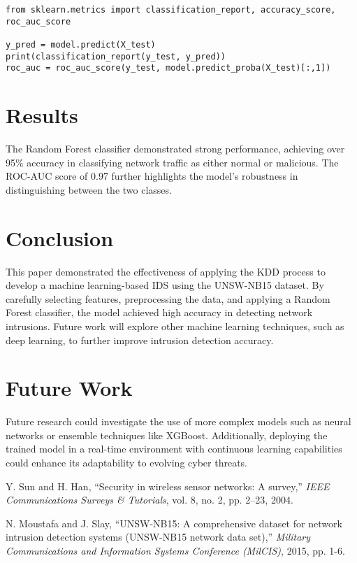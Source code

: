 \documentclass[12pt]{article}
\begin{document}
\begin{verbatim}
from sklearn.metrics import classification_report, accuracy_score, roc_auc_score

y_pred = model.predict(X_test)
print(classification_report(y_test, y_pred))
roc_auc = roc_auc_score(y_test, model.predict_proba(X_test)[:,1])
\end{verbatim}

\section{Results}
The Random Forest classifier demonstrated strong performance, achieving over 95\% accuracy in classifying network traffic as either normal or malicious. The ROC-AUC score of 0.97 further highlights the model’s robustness in distinguishing between the two classes.

\section{Conclusion}
This paper demonstrated the effectiveness of applying the KDD process to develop a machine learning-based IDS using the UNSW-NB15 dataset. By carefully selecting features, preprocessing the data, and applying a Random Forest classifier, the model achieved high accuracy in detecting network intrusions. Future work will explore other machine learning techniques, such as deep learning, to further improve intrusion detection accuracy.

\section{Future Work}
Future research could investigate the use of more complex models such as neural networks or ensemble techniques like XGBoost. Additionally, deploying the trained model in a real-time environment with continuous learning capabilities could enhance its adaptability to evolving cyber threats.

\begin{thebibliography}{9}
Y. Sun and H. Han, ``Security in wireless sensor networks: A survey,'' \textit{IEEE Communications Surveys \& Tutorials}, vol. 8, no. 2, pp. 2–23, 2004.

N. Moustafa and J. Slay, ``UNSW-NB15: A comprehensive dataset for network intrusion detection systems (UNSW-NB15 network data set),'' \textit{Military Communications and Information Systems Conference (MilCIS)}, 2015, pp. 1-6.
\end{thebibliography}
\end{document}
